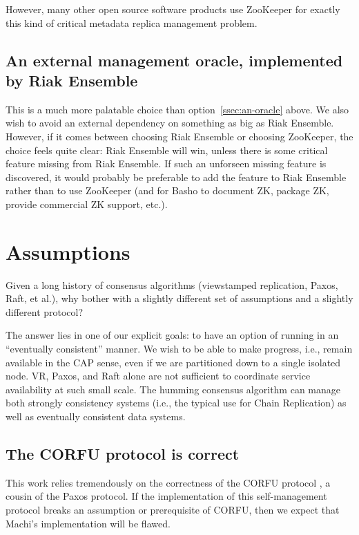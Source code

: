 \documentclass[preprint,10pt]{sigplanconf}
\begin{document}
However, many other open source software products use ZooKeeper for
exactly this kind of critical metadata replica management problem.

\subsection{An external management oracle, implemented by Riak Ensemble}

This is a much more palatable choice than option~\ref{ssec:an-oracle}
above.  We also
wish to avoid an external dependency on something as big as Riak
Ensemble.  However, if it comes between choosing Riak Ensemble or
choosing ZooKeeper, the choice feels quite clear: Riak Ensemble will
win, unless there is some critical feature missing from Riak
Ensemble.  If such an unforseen missing feature is discovered, it
would probably be preferable to add the feature to Riak Ensemble
rather than to use ZooKeeper (and for Basho to document ZK, package
ZK, provide commercial ZK support, etc.).

\section{Assumptions}
\label{sec:assumptions}

Given a long history of consensus algorithms (viewstamped replication,
Paxos, Raft, et al.), why bother with a slightly different set of
assumptions and a slightly different protocol?

The answer lies in one of our explicit goals: to have an option of
running in an ``eventually consistent'' manner.  We wish to be able to
make progress, i.e., remain available in the CAP sense, even if we are
partitioned down to a single isolated node.  VR, Paxos, and Raft
alone are not sufficient to coordinate service availability at such
small scale.  The humming consensus algorithm can manage
both strongly consistency systems (i.e., the typical use for Chain
Replication) as well as eventually consistent data systems.

\subsection{The CORFU protocol is correct}

This work relies tremendously on the correctness of the CORFU
protocol \cite{corfu1}, a cousin of the Paxos protocol.
If the implementation of
this self-management protocol breaks an assumption or prerequisite of
CORFU, then we expect that Machi's implementation will be flawed.
\end{document}
